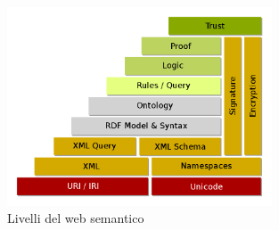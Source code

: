 \documentclass[12pt,a4paper]{report}
\begin{document}
\begin{figure}[h]	
\centering
\includegraphics[width=0.7\textwidth]{images/semanticweblayers.png}
\caption{Livelli del web semantico \cite{semanticWebImage}}
\label{livelliWebSemantico}
\end{figure}
\end{document}
